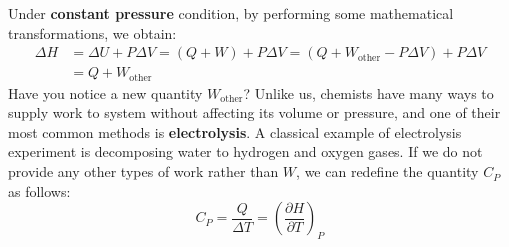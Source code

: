 \documentclass[~/PhyAI/phyai.tex]{subfiles}
\begin{document}
Under \textbf{constant pressure} condition, by performing some mathematical transformations, we obtain:
\begin{equation*}
	\begin{split}
		\Delta H&= \Delta U+P\Delta V=(Q+W)+P\Delta V=(Q+W_{\text{other}}-P\Delta V)+P\Delta V\\
		&= Q+W_{\text{other}}
	\end{split}
\end{equation*}
Have you notice a new quantity $W_{\text{other}}$? Unlike us, chemists have many ways to supply work to system without affecting its volume or pressure, and one of their most common methods is \textbf{electrolysis}. A classical example of electrolysis experiment is decomposing water to hydrogen and oxygen gases. If we do not provide any other types of work rather than $W$, we can redefine the quantity $C_{P}$ as follows:
$$ C_{P}=\frac{Q }{\Delta T}=\left(\frac{\partial H }{\partial T}\right)_{P} $$
\end{document}
